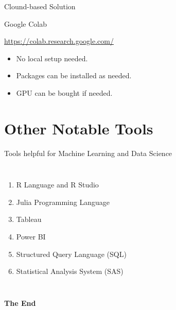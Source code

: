 \documentclass[aspectratio=169,xcolor=dvipsnames,svgnames,x11names,fleqn]{beamer}
\begin{document}
\begin{frame}{Clound-based Solution}
    \begin{center}
    Google Colab

    \url{https://colab.research.google.com/}
    \begin{itemize}
        \item No local setup needed. 
        \item Packages can be installed as needed.
        \item GPU can be bought if needed.
    \end{itemize}
    \end{center}
\end{frame}


\section{Other Notable Tools}

\begin{frame}
    \sectionpage
\end{frame}


\begin{frame}{Tools helpful for Machine Learning and Data Science}

    \begin{columns}
        \begin{enumerate}
            \item R Language and R Studio
            \item Julia Programming Language
            \item Tableau
            \item Power BI
            \item Structured Query Language (SQL)
            \item Statistical Analysis System (SAS)
        \end{enumerate}
    \end{columns}
    
\end{frame}

\begin{frame}
    \Huge{\centerline{\color{bubblegumPink}\textbf{The End}}}
\end{frame}
\end{document}
